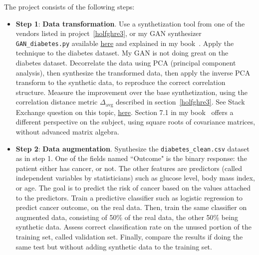 \documentclass[oneside,10pt]{book}
\begin{document}
\noindent The project consists of the following steps: \vspace{1ex}
\begin{itemize}
\item[] {\bf Step 1}:  {\bf Data transformation}. Use a synthetization tool from one of the vendors listed in project~\ref{holfghre3}, 
 or my GAN synthesizer \texttt{GAN\_diabetes.py} available
 \href{https://github.com/VincentGranville/Main/blob/main/GAN_diabetes.py}{here} and explained in my book~\cite{vgelsevier}. Apply the technique to the diabetes dataset. 
 My GAN is not doing great on the diabetes dataset. Decorrelate the data using PCA
 (\textcolor{index}{principal component analysis}), then synthesize the transformed data, then apply the inverse PCA transform to the synthetic data, to reproduce the correct correlation structure. Measure the  improvement 
 over the base synthetization,  using the correlation distance metric $\Delta_{\text{avg}}$ described in section~\ref{holfghre3}.
See Stack Exchange question on this topic, \href{https://stats.stackexchange.com/questions/229092/how-to-reverse-pca-and-reconstruct-original-variables-from-several-principal-com}{here}. Section 7.1 in my book~\cite{vgelsevier} offers a different perspective on the subject, using square roots of covariance matrices, without advanced matrix algebra. \vspace{1ex}
\item[] {\bf Step 2}:   {\bf Data augmentation}. Synthesize the \texttt{diabetes\_clean.csv} dataset as in step 1. One of the
 fields named ``Outcome" is the binary response: the patient either has cancer, or not. The other features are predictors (called independent variables by statisticians) such as glucose level, body mass index, or age. The goal is to predict the risk of cancer based on the values attached to the predictors. Train a predictive classifier such as \textcolor{index}{logistic regression} to predict cancer outcome, on the real data. Then, train the same classifier on \textcolor{index}{augmented data}, consisting of 50\% of the real data, the other 50\% being synthetic data. Assess correct classification rate on the unused portion of the training set, called 
\textcolor{index}{validation set}. Finally, compare the results if doing the same test but without adding synthetic data to the training set.
\vspace{1ex}


\end{itemize}
\end{document}

